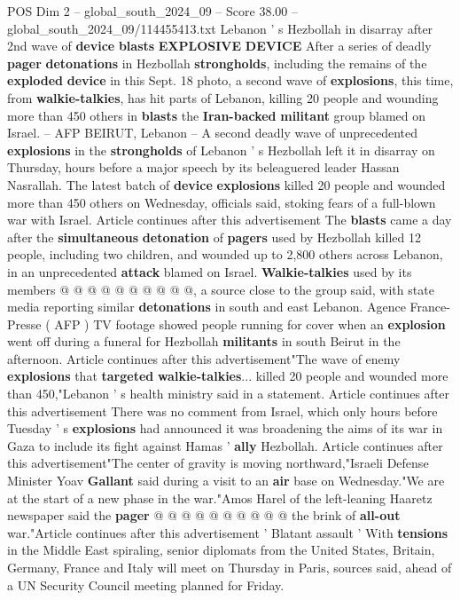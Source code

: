 \begin{textsample}{POS Dim 2 – global\_south\_2024\_09 – Score 38.00 – global\_south\_2024\_09/114455413.txt}  \label{ex:f2_pos_031}
Lebanon ' s Hezbollah in disarray after 2nd wave of \textbf{device} \textbf{blasts} \textbf{EXPLOSIVE} \textbf{DEVICE} After a series of deadly \textbf{pager} \textbf{detonations} in Hezbollah \textbf{strongholds}, including the remains of the \textbf{exploded} \textbf{device} in this Sept. 18 photo, a second wave of \textbf{explosions}, this time, from \textbf{walkie-talkies}, has hit parts of Lebanon, killing 20 people and wounding more than 450 others in \textbf{blasts} the \textbf{Iran-backed} \textbf{militant} group blamed on Israel. -- AFP BEIRUT, Lebanon -- A second deadly wave of unprecedented \textbf{explosions} in the \textbf{strongholds} of Lebanon ' s Hezbollah left it in disarray on Thursday, hours before a major speech by its beleaguered leader Hassan Nasrallah.
The latest batch of \textbf{device} \textbf{explosions} killed 20 people and wounded more than 450 others on Wednesday, officials said, stoking fears of a full-blown war with Israel.
Article continues after this advertisement The \textbf{blasts} came a day after the \textbf{simultaneous} \textbf{detonation} of \textbf{pagers} used by Hezbollah killed 12 people, including two children, and wounded up to 2,800 others across Lebanon, in an unprecedented \textbf{attack} blamed on Israel. \textbf{Walkie-talkies} used by its members @ @ @ @ @ @ @ @ @ @, a source close to the group said, with state media reporting similar \textbf{detonations} in south and east Lebanon.
Agence France-Presse ( AFP ) TV footage showed people running for cover when an \textbf{explosion} went off during a funeral for Hezbollah \textbf{militants} in south Beirut in the afternoon.
Article continues after this advertisement"The wave of enemy \textbf{explosions} that \textbf{targeted} \textbf{walkie-talkies}... killed 20 people and wounded more than 450,"Lebanon ' s health ministry said in a statement.
Article continues after this advertisement There was no comment from Israel, which only hours before Tuesday ' s \textbf{explosions} had announced it was broadening the aims of its war in Gaza to include its fight against Hamas ' \textbf{ally} Hezbollah.
Article continues after this advertisement"The center of gravity is moving northward,"Israeli Defense Minister Yoav \textbf{Gallant} said during a visit to an \textbf{air} base on Wednesday."We are at the start of a new phase in the war."Amos Harel of the left-leaning Haaretz newspaper said the \textbf{pager} @ @ @ @ @ @ @ @ @ @ the brink of \textbf{all-out} war."Article continues after this advertisement ' Blatant assault ' With \textbf{tensions} in the Middle East spiraling, senior diplomats from the United States, Britain, Germany, France and Italy will meet on Thursday in Paris, sources said, ahead of a UN Security Council meeting planned for Friday.

\end{textsample}
